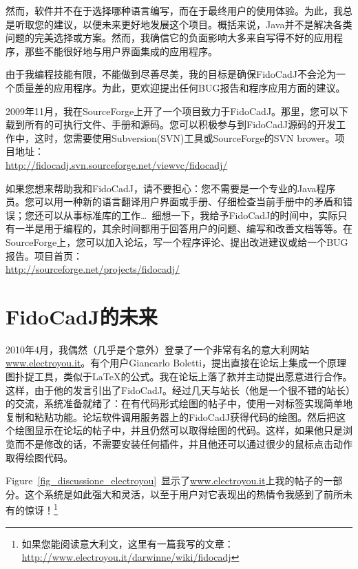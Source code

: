 \documentclass[10pt,a4paper,twoside]{scrreprt}
\begin{document}
然而，软件并不在于选择哪种语言编写，而在于最终用户的使用体验。为此，我总是听取您的建议，以便未来更好地发展这个项目。概括来说，Java并不是解决各类问题的完美选择或方案。然而，我确信它的负面影响大多来自写得不好的应用程序，那些不能很好地与用户界面集成的应用程序。

由于我编程技能有限，不能做到尽善尽美，我的目标是确保FidoCadJ不会沦为一个质量差的应用程序。为此，更欢迎提出任何BUG报告和程序应用方面的建议。

2009年11月，我在SourceForge上开了一个项目致力于FidoCadJ。那里，您可以下载到所有的可执行文件、手册和源码。您可以积极参与到FidoCadJ源码的开发工作中，这时，您需要使用Subversion(SVN)工具或SourceForge的SVN brower。项目地址：\\ \href{http://fidocadj.svn.sourceforge.net/viewvc/fidocadj/}{http://fidocadj.svn.sourceforge.net/viewvc/fidocadj/} 

如果您想来帮助我和FidoCadJ，请不要担心：您不需要是一个专业的Java程序员。您可以用一种新的语言翻译用户界面或手册、仔细检查当前手册中的矛盾和错误；您还可以从事标准库的工作\dots\ 细想一下，我给予FidoCadJ的时间中，实际只有一半是用于编程的，其余时间都用于回答用户的问题、编写和改善文档等等。在SourceForge上，您可以加入论坛，写一个程序评论、提出改进建议或给一个BUG报告。项目首页：\\ \href{http://sourceforge.net/projects/fidocadj/}{http://sourceforge.net/projects/fidocadj/}

\section{FidoCadJ的未来}

2010年4月，我偶然（几乎是个意外）登录了一个非常有名的意大利网站\href{www.electroyou.it}{www.electroyou.it}。有个用户Giancarlo Boletti，提出直接在论坛上集成一个原理图扑捉工具，类似于\LaTeX{}的公式。我在论坛上落了款并主动提出愿意进行合作。这样，由于他的发言引出了FidoCadJ。经过几天与站长（他是一个很不错的站长）的交流，系统准备就绪了：在有代码形式绘图的帖子中，使用一对标签实现简单地复制和粘贴功能。论坛软件调用服务器上的FidoCadJ获得代码的绘图。然后把这个绘图显示在论坛的帖子中，并且仍然可以取得绘图的代码。这样，如果他只是浏览而不是修改的话，不需要安装任何插件，并且他还可以通过很少的鼠标点击动作取得绘图代码。

Figure~\ref{fig_discussione_electroyou}~显示了\href{www.electroyou.it}{www.electroyou.it}上我的帖子的一部分。这个系统是如此强大和灵活，以至于用户对它表现出的热情令我感到了前所未有的惊讶！\footnote{如果您能阅读意大利文，这里有一篇我写的文章：\\ \href{http://www.electroyou.it/darwinne/wiki/fidocadj}{http://www.electroyou.it/darwinne/wiki/fidocadj}	 }
 	 
\end{document}
